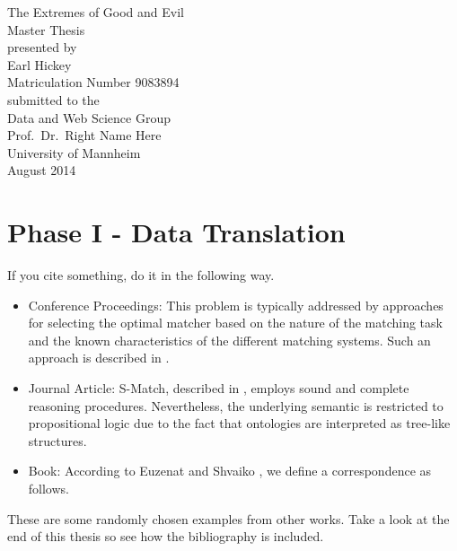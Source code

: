 \documentclass[11pt,titlepage,oneside,openany]{book}
\begin{document}
\begin{titlepage}
	\vspace*{2cm}
  \begin{center}
   {\Large The Extremes of Good and Evil\\}
   \vspace{2cm} 
   {Master Thesis\\}
   \vspace{2cm}
   {presented by\\
    Earl Hickey \\
    Matriculation Number 9083894\\
   }
   \vspace{1cm} 
   {submitted to the\\
    Data and Web Science Group\\
    Prof.\ Dr.\ Right Name Here\\
    University of Mannheim\\} \vspace{2cm}
   {August 2014}
  \end{center}
\end{titlepage} 

\tableofcontents
\newpage

\listofalgorithms

\listoffigures

\listoftables


\newpage



\chapter{Phase I - Data Translation}
\label{cha:data-translation}



If you cite something, do it in the following way. 
\begin{itemize}
	\item Conference Proceedings: This problem is typically addressed by approaches for selecting the optimal matcher based on the nature of the matching task and the known characteristics of the different matching systems. Such an approach is described in \cite{mochol08matcher}.
	\item Journal Article: S-Match, described in \cite{giunchiglia2008semanticmatching}, employs sound and complete reasoning procedures. Nevertheless, the underlying semantic is restricted to propositional logic due to the fact that ontologies are interpreted as tree-like structures.
	\item Book: According to Euzenat and Shvaiko \cite{euzenat07matcherbook}, we define a correspondence as follows.
\end{itemize}
These are some randomly chosen examples from other works. Take a look at the end of this thesis so see how the bibliography is included.
\end{document}
